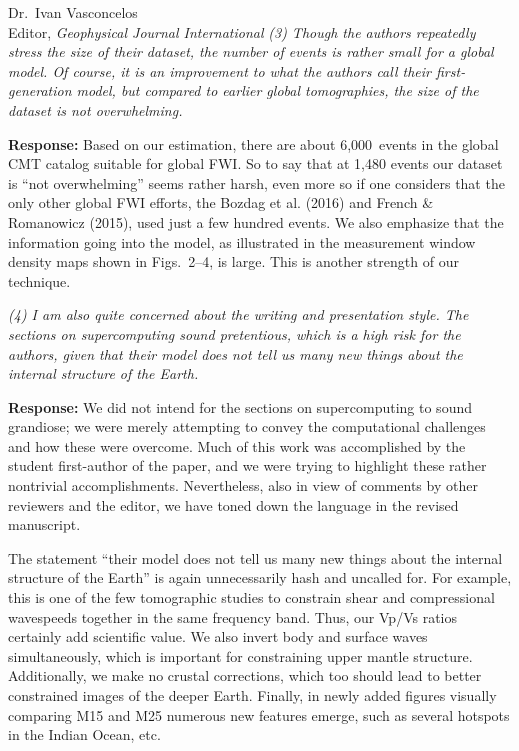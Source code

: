 \documentclass[11pt,a4paper]{letter}
\newcommand{\response}[1]{\textbf{Response:} #1}
\newcommand{\rev}[1]{{\it{#1}}}
\begin{document}
\begin{letter}{Dr.~Ivan Vasconcelos\\
Editor, \textit{Geophysical Journal International}}
\rev{(3) Though the authors repeatedly stress the size of their dataset, the number of events is rather small for a global model. Of course, it is an improvement to what the authors call their first-generation model, but compared to earlier global tomographies, the size of the dataset is not overwhelming.
}

\response{
Based on our estimation, there are about 6,000~events in the global CMT catalog suitable for global FWI.
So to say that at 1,480 events our dataset is ``not overwhelming'' seems rather harsh,
even more so if one considers that the only other global FWI efforts,
the Bozdag et al. (2016) and French \& Romanowicz (2015),
used just a few hundred events.
We also emphasize that the information going into the model,
as illustrated in the measurement window density maps shown in Figs.~2--4, is large.
This is another strength of our technique.
}


\rev{(4) I am also quite concerned about the writing and presentation style. The sections on supercomputing sound pretentious, which is a high risk for the authors, given that their model does not tell us many new things about the internal structure of the Earth. 
}

\response{
We did not intend for the sections on supercomputing to sound grandiose; we were merely attempting to convey the computational challenges and how these were overcome.
Much of this work was accomplished by the student first-author of the paper, and we were trying to highlight these rather nontrivial accomplishments.
Nevertheless, also in view of comments by other reviewers and the editor, we have toned down the language in the revised manuscript.

The statement ``their model does not tell us many new things about the internal structure of the Earth'' is again unnecessarily hash and uncalled for.
For example,
this is one of the few tomographic studies to constrain shear and compressional wavespeeds together in the same frequency band.
Thus, our Vp/Vs ratios certainly add scientific value.
We also invert body and surface waves simultaneously, which is important for constraining upper mantle structure.
Additionally, we make no crustal corrections, 
which too should lead to better constrained images of the deeper Earth.
Finally, in newly added figures visually comparing M15 and M25 numerous new features emerge,
such as several hotspots in the Indian Ocean, etc. 
}


\end{letter}
\end{document}
